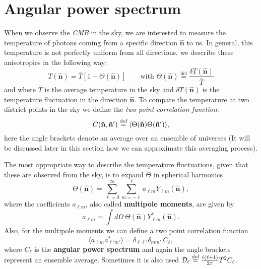 \section{Angular power spectrum}\label{sec:AngularPowerSpectrum}
When we observe the \emph{CMB} in the sky, we are interested to measure the temperature of photons coming from a specific direction $\mathbf{\hat{n}}$ to us. In general, this temperature is not perfectly uniform from all directions, we describe these anisotropies in the following way:
$$T(\mathbf{\hat{n}}) = \bar{T} \left[1 + \Theta(\mathbf{\hat{n}})\right] \qquad \text{with } \Theta(\mathbf{\hat{n}}) \stackrel{\text{def}}{=} \frac{\delta T(\mathbf{\hat{n}})}{\bar{T}}$$
and where $\bar{T}$ is the average temperature in the sky and $\delta T(\mathbf{\hat{n}})$ is the temperature fluctuation in the direction $\mathbf{\hat{n}}$.
To compare the temperature at two district points in the sky we define the \emph{two point correlation function}:
\begin{equation} \label{eq:ani2pcf}
    C(\mathbf{\hat{n}},\mathbf{\hat{n}}') \stackrel{\text{def}}{=} \langle \Theta(\mathbf{\hat{n}})\Theta(\mathbf{\hat{n}}') \rangle,
\end{equation}
here the angle brackets denote an average over an ensemble of universes (It will be discussed later in this section how we can approximate this averaging process).


The most appropriate way to describe the temperature fluctuations, given that these are observed from the sky, is to expand $\Theta$ in spherical harmonics
\begin{equation}\label{eq:harmexpansion}
    \Theta(\mathbf{\hat{n}}) = \sum_{\ell=0}^{\infty} \sum_{m=-\ell}^{\ell} a_{\ell m} Y_{\ell m}(\mathbf{\hat{n}}),
\end{equation}
where the coefficients $a_{\ell m}$, also called \textbf{multipole moments}, are given by
\begin{equation*}
    a_{\ell m} = \int d\Omega\ \Theta(\mathbf{\hat{n}}) Y^*_{\ell m}(\mathbf{\hat{n}}).
\end{equation*}
Also, for the multipole moments we can define a two point correlation function
\begin{equation}\label{eq:angularpowerspectrum}
    \langle a_{\ell m} a^*_{\ell' m'} \rangle = \delta_{\ell \ell'} \delta_{m m'}\ C_{\ell},
\end{equation}
where $C_{\ell}$ is the \textbf{angular power spectrum} and again the angle brackets represent an ensemble average. Sometimes it is also used $\mathcal{D}_\ell \stackrel{\text{def}}{=} \frac{\ell(\ell+1)}{2\pi}\bar{T}^2C_{\ell}$.

